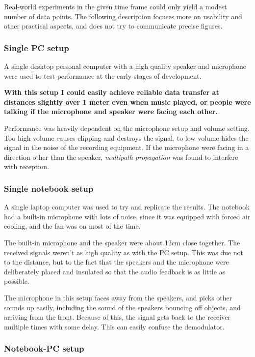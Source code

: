 \documentclass[a4paper]{article}
\begin{document}
Real-world experiments in the given time frame could only yield a
modest number of data points. The following description focuses more on
usability and other practical aspects, and does not try to communicate
precise figures.

\subsubsection{Single PC setup}

A single desktop personal computer with a high quality speaker and 
microphone were used to test performance at the early stages of 
development.

\textbf{With this setup I could easily achieve reliable data transfer 
at distances slightly over 1 meter even when music played, or people 
were talking if the microphone and speaker were facing each other.}

Performance was heavily dependent on the microphone setup and volume 
setting. Too high volume causes clipping and destroys the signal, to 
low volume hides the signal in the noise of the recording equipment. If 
the microphone were facing in a direction other than the speaker, 
\emph{multipath propagation} was found to interfere with reception.

\subsubsection{Single notebook setup}

A single laptop computer was used to try and replicate the results. The 
notebook had a built-in microphone with lots of noise, since it was 
equipped with forced air cooling, and the fan was on most of the time.

The built-in microphone and the speaker were about 12cm close together. 
The received signals weren't as high quality as with the PC setup. This 
was due not to the distance, but to the fact that the speakers and the 
microphone were deliberately placed and insulated so that the audio 
feedback is as little as possible.

The microphone in this setup faces away from the speakers, and picks 
other sounds up easily, including the sound of the speakers bouncing
off objects, and arriving from the front. Because of this, the signal
gets back to the receiver multiple times with some delay.
This can easily confuse the demodulator.

\subsubsection{Notebook-PC setup}
\end{document}
